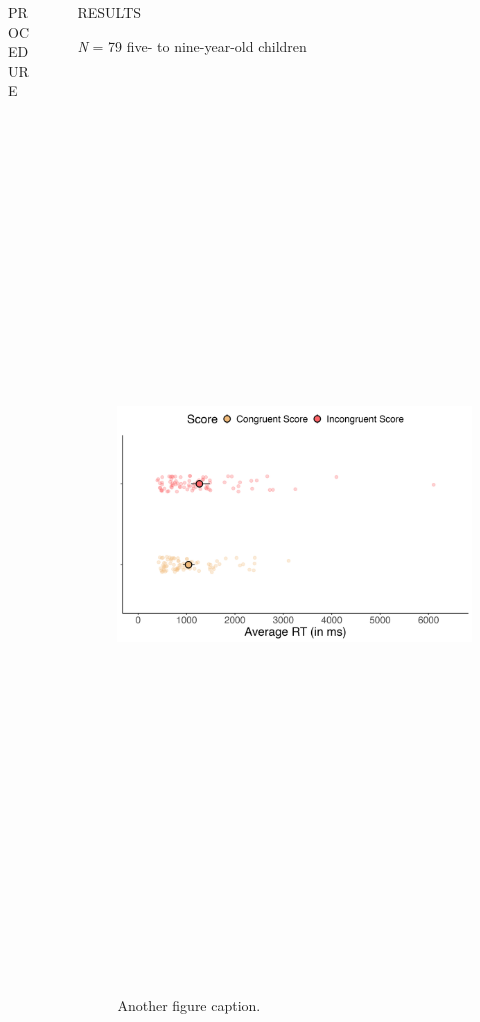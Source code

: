 \documentclass[final]{beamer}
\newlength{\sepwidth}
\newlength{\colwidth}
\newlength{\widecolwidth}
\newcommand{\separatorcolumn}{\begin{column}{\sepwidth}\end{column}}
\begin{document}
\begin{frame}[t]
\begin{columns}[t]
\begin{column}{\colwidth}
\begin{block}{PROCEDURE}
  \end{block}

\end{column}

\separatorcolumn

\begin{column}{\widecolwidth}

  \begin{block}{RESULTS}
  
  \emph{N} = 79 five- to nine-year-old children

    \begin{figure}
      	{\includegraphics[height=24cm,left]{plots/figure1.png}}
      \caption{Another figure caption.}
    \end{figure}
    

\end{block}
\end{column}
\end{columns}
\end{frame}
\end{document}
